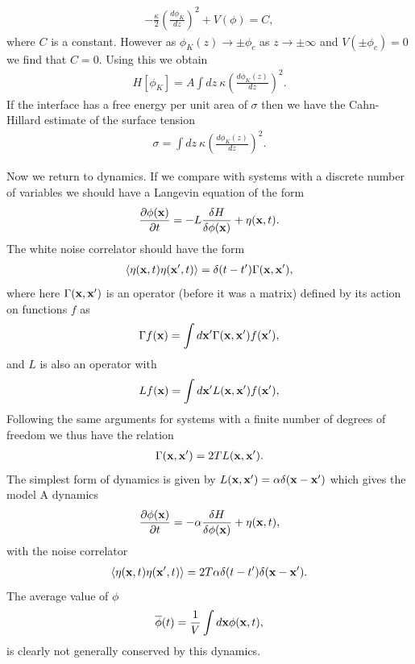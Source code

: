 \begin{align}
-\frac{\kappa}{2} (\frac{d\phi_K}{dz})^2 + V(\phi) = C,
\end{align}
where $C$ is a constant. However as $\phi_K(z)\to \pm \phi_c$ as $z\to \pm \infty$ and $V(\pm\phi_c) =0$ we find that $C=0$. Using this we obtain 
\begin{align}
H[\phi_K]=  A\int dz\  {\kappa}\left(\frac{d\phi_K(z)}{dz}\right)^2 .
\end{align}
If the interface has a free energy per unit area of $\sigma$ then we have the Cahn-Hillard estimate of the surface tension 
\begin{align}
\sigma=  \int dz\  {\kappa}\left(\frac{d\phi_K(z)}{dz}\right)^2 .
\end{align}

Now we return to dynamics. If we compare with systems with a discrete number of variables we
should have a Langevin equation of the form
\begin{align}
\frac{\partial \phi({\bf x})}{\partial t}= -L \frac{\delta H}{\delta \phi({\bf x})} + \eta({\bf x},t).
\end{align}
The white noise correlator should have the form
\begin{align}
\langle \eta({\bf x},t)\eta({\bf x}',t)\rangle =\delta(t-t')\Gamma({\bf x},{\bf x'}),
\end{align}
where here  $\Gamma({\bf x},{\bf x'})$ is an operator (before it was a matrix) defined by its action on functions $f$ as
\begin{align}
\Gamma f({\bf x}) = \int d{\bf x}' \Gamma({\bf x},{\bf x}')f({\bf x}'),
\end{align}
and $L$ is also an operator with 
\begin{align}
L f({\bf x}) = \int d{\bf x}' L({\bf x},{\bf x}')f({\bf x}'),
\end{align}
Following the same arguments for systems with a finite number of degrees of freedom we thus have the relation
\begin{align} 
\Gamma({\bf x},{\bf x}') =2T L({\bf x},{\bf x}').
\end{align}
The simplest form of dynamics is given by $L({\bf x},{\bf x}')=\alpha\delta({\bf x}-{\bf x}')$ which gives the model A dynamics
\begin{align}
\frac{\partial \phi({\bf x})}{\partial t}= -\alpha \frac{\delta H}{\delta \phi({\bf x})} + \eta({\bf x},t),
\end{align}
with the noise correlator
\begin{align}
\langle \eta({\bf x},t)\eta({\bf x}',t)\rangle =2T \alpha \delta(t-t')\delta({\bf x}-{\bf x'}).
\end{align}
The average value of $\phi$ 
\begin{align}
\overline \phi(t) = \frac{1}{V}\int d{\bf x} \phi({\bf x},t),
\end{align}
is clearly not generally conserved by this dynamics.

